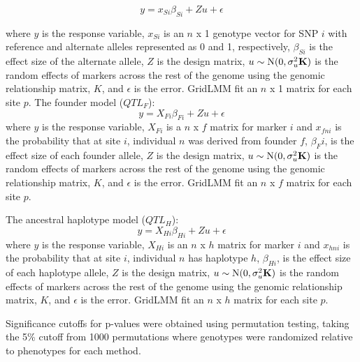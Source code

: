 \documentclass[article,9pt,twocolumn,twoside]{rilabRxiv}
\begin{document}
\begin{equation}
\label{eqn:gridlmm1}
 y = x_{Si}{\beta_{Si}} + Zu + \epsilon
\end{equation}

where $y$ is the response variable, $x_{Si}$ is an $n$ x 1 genotype vector for SNP $i$ with reference and alternate alleles represented as 0 and 1, respectively, $\beta_{Si}$ is the effect size of the alternate allele, $Z$ is the design matrix, $u \sim \mbox{N}(0,\sigma^2_u \bf{K})$ is the random effects of markers across the rest of the genome using the genomic relationship matrix, $K$, and $\epsilon$ is the error.
GridLMM fit an $n$ x 1 matrix for each site $p$.
The founder model ($QTL_F$):
\begin{equation}
\label{eqn:gridlmm2}
 y = X_{Fi}{\beta_{Fi}} + Zu + \epsilon
\end{equation}
where $y$ is the response variable, $X_{Fi}$ is a $n$ x $f$ matrix for marker $i$ and $x_{fni}$ is the probability that at site $i$, individual $n$ was derived from founder $f$, $\beta_Fi$, is the effect size of each founder allele, $Z$ is the design matrix, $u \sim \mbox{N}(0,\sigma^2_u \bf{K})$ is the random effects of markers across the rest of the genome using the genomic relationship matrix, $K$, and $\epsilon$ is the error. GridLMM fit an $n$ x $f$ matrix for each site $p$.

The ancestral haplotype model ($QTL_H$):
\begin{equation}
\label{eqn:gridlmm3}
 y = X_{Hi}{\beta_{Hi}} + Zu + \epsilon
\end{equation}
where $y$ is the response variable, $X_{Hi}$ is an $n$ x $h$ matrix for marker $i$ and $x_{hni}$ is the probability that at site $i$, individual $n$ has haplotype $h$, $\beta_{Hi}$, is the effect size of each haplotype allele, $Z$ is the design matrix, $u \sim \mbox{N}(0,\sigma^2_u \bf{K})$ is the random effects of markers across the rest of the genome using the genomic relationship matrix, $K$, and $\epsilon$ is the error. GridLMM fit an $n$ x $h$ matrix for each site $p$.

 Significance cutoffs for p-values were obtained using permutation testing, taking the 5\% cutoff from 1000 permutations where genotypes were randomized relative to phenotypes for each method.
\end{document}
